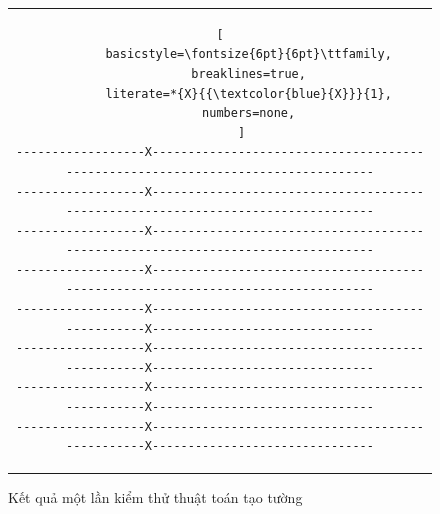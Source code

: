 \documentclass[12pt,a4paper]{article}
\begin{document}
\begin{figure}[H]
\begin{tabular}{c}
\begin{lstlisting}[
        basicstyle=\fontsize{6pt}{6pt}\ttfamily,
        breaklines=true,
        literate=*{X}{{\textcolor{blue}{X}}}{1},
        numbers=none,
      ]
------------------X---------------------------------------------------------------------------------
------------------X---------------------------------------------------------------------------------
------------------X---------------------------------------------------------------------------------
------------------X---------------------------------------------------------------------------------
------------------X-------------------------------------------------X-------------------------------
------------------X-------------------------------------------------X-------------------------------
------------------X-------------------------------------------------X-------------------------------
------------------X-------------------------------------------------X-------------------------------
      \end{lstlisting}
    \end{tabular}
    \caption{Kết quả một lần kiểm thử thuật toán tạo tường}
    \label{test_gen_map}
  \end{figure}
\end{document}
